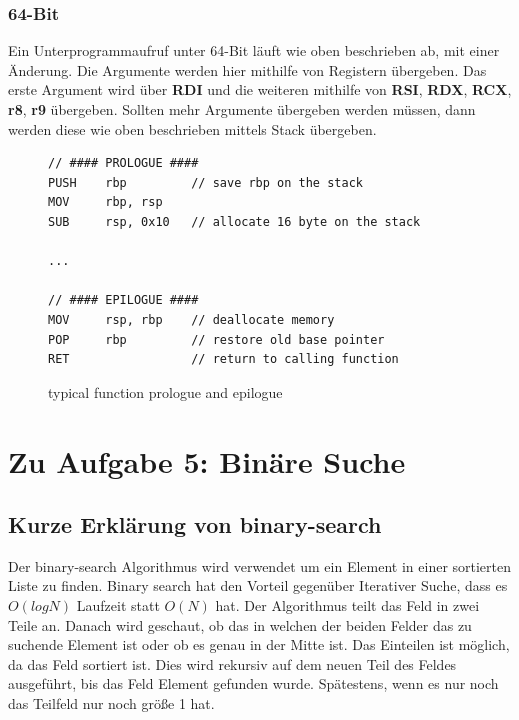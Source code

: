 \documentclass[12pt]{article}
\begin{document}
\subsubsection*{64-Bit}
Ein Unterprogrammaufruf unter 64-Bit läuft wie oben beschrieben ab, mit einer Änderung. Die Argumente werden hier mithilfe von Registern übergeben. Das erste Argument wird über \textbf{RDI} und die weiteren mithilfe von \textbf{RSI}, \textbf{RDX}, \textbf{RCX}, \textbf{r8}, \textbf{r9} übergeben. Sollten mehr Argumente übergeben werden müssen, dann werden diese wie oben beschrieben mittels Stack übergeben.


\begin{figure}[h]
\begin{lstlisting}
// #### PROLOGUE ####
PUSH	rbp			// save rbp on the stack
MOV		rbp, rsp
SUB		rsp, 0x10	// allocate 16 byte on the stack

...

// #### EPILOGUE ####
MOV		rsp, rbp	// deallocate memory
POP		rbp			// restore old base pointer
RET					// return to calling function
\end{lstlisting}
\label{lst:epipro}
\caption{typical function prologue and epilogue}
\end{figure}


\newpage
\section{Zu Aufgabe 5: Binäre Suche}

\subsection{Kurze Erklärung von binary-search}

Der binary-search Algorithmus wird verwendet um ein Element in einer sortierten Liste zu finden.
Binary search hat den Vorteil gegenüber Iterativer Suche, dass es $O(log N)$ Laufzeit statt $O(N)$ hat.
Der Algorithmus teilt das Feld in zwei Teile an. Danach wird geschaut, ob das in welchen der beiden Felder das zu suchende
Element ist oder ob es genau in der Mitte ist. Das Einteilen ist möglich, da das Feld sortiert ist. 
Dies wird rekursiv auf dem neuen Teil des Feldes ausgeführt, bis das Feld Element gefunden wurde. 
Spätestens, wenn es nur noch das Teilfeld nur noch größe 1 hat.
\end{document}
